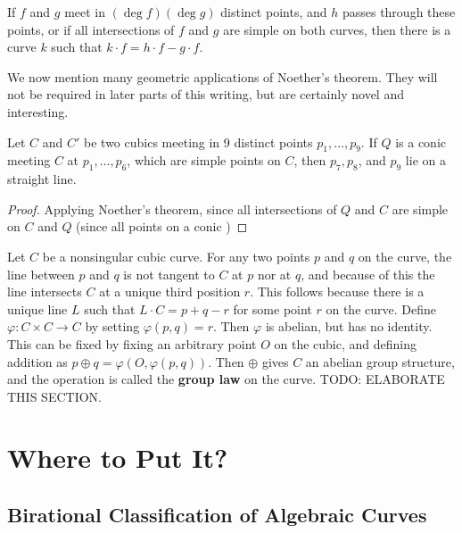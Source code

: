 \begin{corollary}
    If $f$ and $g$ meet in $(\deg f)(\deg g)$ distinct points, and $h$ passes through these points, or if all intersections of $f$ and $g$ are simple on both curves, then there is a curve $k$ such that $k \cdot f = h \cdot f - g \cdot f$.
\end{corollary}

We now mention many geometric applications of Noether's theorem. They will not be required in later parts of this writing, but are certainly novel and interesting.

\begin{theorem}
    Let $C$ and $C'$ be two cubics meeting in 9 distinct points $p_1, \dots, p_9$. If $Q$ is a conic meeting $C$ at $p_1, \dots, p_6$, which are simple points on $C$, then $p_7, p_8$, and $p_9$ lie on a straight line.
\end{theorem}
\begin{proof}
    Applying Noether's theorem, since all intersections of $Q$ and $C$ are simple on $C$ and $Q$ (since all points on a conic )
\end{proof}

Let $C$ be a nonsingular cubic curve. For any two points $p$ and $q$ on the curve, the line between $p$ and $q$ is not tangent to $C$ at $p$ nor at $q$, and because of this the line intersects $C$ at a unique third position $r$. This follows because there is a unique line $L$ such that $L \cdot C = p + q - r$ for some point $r$ on the curve. Define $\varphi: C \times C \to C$ by setting $\varphi(p,q) = r$. Then $\varphi$ is abelian, but has no identity. This can be fixed by fixing an arbitrary point $O$ on the cubic, and defining addition as $p \oplus q = \varphi(O, \varphi(p,q))$. Then $\oplus$ gives $C$ an abelian group structure, and the operation is called the {\bf group law} on the curve. TODO: ELABORATE THIS SECTION.


\chapter{Where to Put It?}

\section{Birational Classification of Algebraic Curves}

